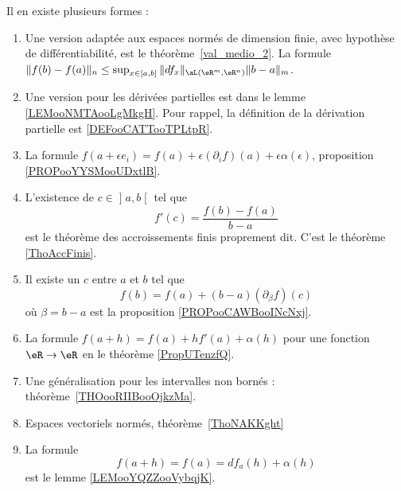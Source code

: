         \label{INTERNooXFNTooNNaOzP}
Il en existe plusieurs formes :
\begin{enumerate}
	\item
	      Une version adaptée aux espaces normés de dimension finie, avec hypothèse de différentiabilité, est le théorème~\ref{val_medio_2}. La formule \( \|f(b)-f(a)\|_n\leq \sup_{x\in[a,b]}\|df_x\|_{\aL(\eR^m,\eR^n)}\|b-a\|_m\).
	\item
	      Une version pour les dérivées partielles est dans le lemme \ref{LEMooNMTAooLgMkgH}. Pour rappel, la définition de la dérivation partielle est \ref{DEFooCATTooTPLtpR}.
	\item
	      La formule \( f(a+\epsilon e_i)=f(a)+\epsilon(\partial_if)(a)+\epsilon\alpha(\epsilon)\), proposition \ref{PROPooYYSMooUDxtlB}.
	\item
	      L'existence de \( c\in \mathopen] a , b \mathclose[\) tel que
	      \begin{equation}
		      f'(c)=\frac{ f(b)-f(a) }{ b-a }
	      \end{equation}
	      est le théorème des accroissements finis proprement dit. C'est le théorème \ref{ThoAccFinis}.
	\item
	      Il existe un \( c\) entre \( a\) et \( b\) tel que
	      \begin{equation}
		      f(b)=f(a)+(b-a)(\partial_{\beta}f)(c)
	      \end{equation}
	      où \( \beta=b-a\) est la proposition \ref{PROPooCAWBooINcNxj}.
	\item
	      La formule \( f(a+h)=f(a)+hf'(a)+\alpha(h)\) pour une fonction \( \eR\to \eR\) en le théorème \ref{PropUTenzfQ}.
	\item
	      Une généralisation pour les intervalles non bornés : théorème~\ref{THOooRIIBooOjkzMa}.
	\item
	      Espaces vectoriels normés, théorème~\ref{ThoNAKKght}
	\item
	      La formule
	      \begin{equation}
		      f(a+h)=f(a)=df_a(h)+\alpha(h)
	      \end{equation}
	      est le lemme \ref{LEMooYQZZooVybqjK}.
\end{enumerate}

